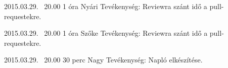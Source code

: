\begin{naplo}
    \bejegyzes
    {2015.03.29. ~20.00}
    {1 óra}
    {Nyári} 
    {Tevékenység: Reviewra szánt idő a pull-requestekre.\newline } 

    \bejegyzes
    {2015.03.29. ~20.00}
    {1 óra}
    {Szőke} 
    {Tevékenység: Reviewra szánt idő a pull-requestekre.\newline } 
    
	\bejegyzes
	{2015.03.29. ~20.00}
	{30 perc}
	{Nagy} 
	{Tevékenység: Napló elkészítése.\newline } 
	
\end{naplo}



